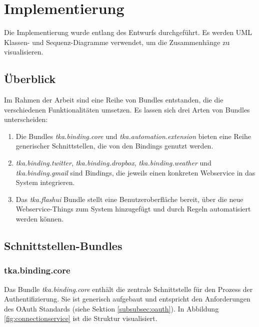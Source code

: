 \chapter{Implementierung}
Die Implementierung wurde entlang des Entwurfs durchgeführt. Es werden UML Klassen- und Sequenz-Diagramme verwendet, um die Zusammenhänge zu visualisieren.

\section{Überblick}
Im Rahmen der Arbeit sind eine Reihe von Bundles entstanden, die die verschiedenen Funktionalitäten umsetzen. Es lassen sich drei Arten von Bundles unterscheiden:
\begin{enumerate}
\item Die Bundles \textit{tka.binding.core} und \textit{tka.automation.extension} bieten eine Reihe generischer Schnittstellen, die von den Bindings genutzt werden.
\item \textit{tka.binding.twitter}, \textit{tka.binding.dropbox}, \textit{tka.binding.weather} und \textit{tka.binding.gmail} sind Bindings, die jeweils einen konkreten Webservice in das System integrieren. 
\item Das \textit{tka.flashui} Bundle stellt eine Benutzeroberfläche bereit, über die neue Webservice-Things zum System hinzugefügt und durch Regeln automatisiert werden können.
\end{enumerate}


\section{Schnittstellen-Bundles}

\subsection{tka.binding.core}
\label{impl:core}
Das Bundle \textit{tka.binding.core} enthält die zentrale Schnittstelle für den Prozess der Authentifizierung. Sie ist generisch aufgebaut und entspricht den Anforderungen des OAuth Standards (siehe Sektion \ref{subsubsec:oauth}). In Abbildung \ref{fig:connectionservice} ist die Struktur visualisiert.

